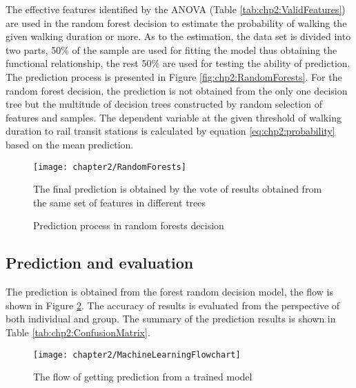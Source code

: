 The effective features identified by the ANOVA (Table \ref{tab:chp2:ValidFeatures}) are used in the random forest decision to estimate the probability of walking the given walking duration or more. As to the estimation, the data set is divided into two parts, 50\% of the sample are used for fitting the model thus obtaining the functional relationship, the rest 50\% are used for testing the ability of prediction. The prediction process is presented in Figure \ref{fig:chp2:RandomForests}. For the random forest decision, the prediction is not obtained from the only one decision tree but the multitude of decision trees constructed by random selection of features and samples. The dependent variable at the given threshold of walking duration to rail transit stations is calculated by equation \ref{eq:chp2:probability} based on the mean prediction.

\begin{figure}[htbp]
	\centering
	\texttt{[image: chapter2/RandomForests]}
	\caption{Prediction process in random forests decision}
	\label{fig:chp2:RandomForests}
	\begin{description}
		\small
		\label{note:fig:chp2:RandomForests}
		\item[Note:] The final prediction is obtained by the vote of results obtained from the same set of features in different trees
	\end{description}
\end{figure}

%
\subsection{Prediction and evaluation}
The prediction is obtained from the forest random decision model, the flow is shown in Figure \ref{fig:chp2:MachineLearningFlowchart}. The accuracy of results is evaluated from the perspective of both individual and group. The summary of the prediction results is shown in Table \ref{tab:chp2:ConfusionMatrix}.

\begin{figure}[htbp]
	\centering
	\texttt{[image: chapter2/MachineLearningFlowchart]}
	\caption{The flow of getting prediction from a trained model}
	\label{fig:chp2:MachineLearningFlowchart}
\end{figure}

